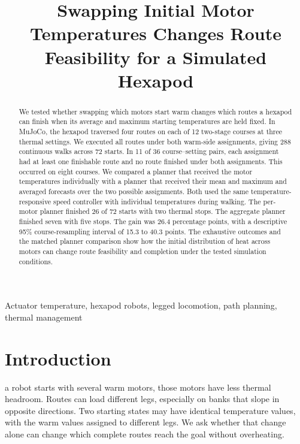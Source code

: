 \documentclass{ieeeaccess}
\begin{document}

\title{Swapping Initial Motor Temperatures Changes Route Feasibility for a Simulated Hexapod}
\begin{abstract}
We tested whether swapping which motors start warm changes which routes a hexapod can finish when its average and maximum starting temperatures are held fixed. In MuJoCo, the hexapod traversed four routes on each of 12 two-stage courses at three thermal settings. We executed all routes under both warm-side assignments, giving 288 continuous walks across 72 starts. In 11 of 36 course--setting pairs, each assignment had at least one finishable route and no route finished under both assignments. This occurred on eight courses. We compared a planner that received the motor temperatures individually with a planner that received their mean and maximum and averaged forecasts over the two possible assignments. Both used the same temperature-responsive speed controller with individual temperatures during walking. The per-motor planner finished 26 of 72 starts with two thermal stops. The aggregate planner finished seven with five stops. The gain was 26.4 percentage points, with a descriptive 95\% course-resampling interval of 15.3 to 40.3 points. The exhaustive outcomes and the matched planner comparison show how the initial distribution of heat across motors can change route feasibility and completion under the tested simulation conditions.
\end{abstract}

\begin{keywords}
Actuator temperature, hexapod robots, legged locomotion, path planning, thermal management
\end{keywords}
\titlepgskip=-21pt
\maketitle

\section{Introduction}

 a robot starts with several warm motors, those motors have less thermal headroom. Routes can load different legs, especially on banks that slope in opposite directions. Two starting states may have identical temperature values, with the warm values assigned to different legs. We ask whether that change alone can change which complete routes reach the goal without overheating.
\end{document}
